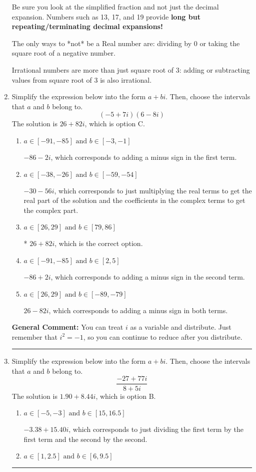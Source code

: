 \documentclass{extbook}[14pt]
\newcommand{\litem}[1]{\item #1

\rule{\textwidth}{0.4pt}}
\begin{document}
\begin{enumerate}
{ Be sure you look at the simplified fraction and not just the decimal expansion. Numbers such as 13, 17, and 19 provide \textbf{long but repeating/terminating decimal expansions!} 
 
 The only ways to *not* be a Real number are: dividing by 0 or taking the square root of a negative number. 
 
 Irrational numbers are more than just square root of 3: adding or subtracting values from square root of 3 is also irrational.
}
\litem{
Simplify the expression below into the form $a+bi$. Then, choose the intervals that $a$ and $b$ belong to.
\[ (-5 + 7 i)(6 - 8 i) \]The solution is \( 26 + 82 i \), which is option C.\begin{enumerate}[label=\Alph*.]
\item \( a \in [-91, -85] \text{ and } b \in [-3, -1] \)

 $-86 - 2 i$, which corresponds to adding a minus sign in the first term.
\item \( a \in [-38, -26] \text{ and } b \in [-59, -54] \)

 $-30 - 56 i$, which corresponds to just multiplying the real terms to get the real part of the solution and the coefficients in the complex terms to get the complex part.
\item \( a \in [26, 29] \text{ and } b \in [79, 86] \)

* $26 + 82 i$, which is the correct option.
\item \( a \in [-91, -85] \text{ and } b \in [2, 5] \)

 $-86 + 2 i$, which corresponds to adding a minus sign in the second term.
\item \( a \in [26, 29] \text{ and } b \in [-89, -79] \)

 $26 - 82 i$, which corresponds to adding a minus sign in both terms.
\end{enumerate}

\textbf{General Comment:} You can treat $i$ as a variable and distribute. Just remember that $i^2=-1$, so you can continue to reduce after you distribute.
}
\litem{
Simplify the expression below into the form $a+bi$. Then, choose the intervals that $a$ and $b$ belong to.
\[ \frac{-27 + 77 i}{8 + 5 i} \]The solution is \( 1.90  + 8.44 i \), which is option B.\begin{enumerate}[label=\Alph*.]
\item \( a \in [-5, -3] \text{ and } b \in [15, 16.5] \)

 $-3.38  + 15.40 i$, which corresponds to just dividing the first term by the first term and the second by the second.
\item \( a \in [1, 2.5] \text{ and } b \in [6, 9.5] \)


\end{enumerate}}
\end{enumerate}
\end{document}
